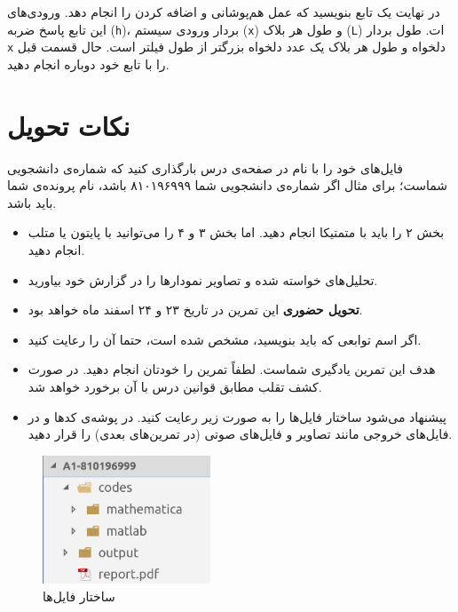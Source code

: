 \documentclass{utsignal}
\begin{document}
	در نهایت یک تابع بنویسید که عمل هم‌پوشانی و اضافه کردن را انجام دهد. ورودی‌های این تابع پاسخ ضربه (\lstinline[language=Octave]{h})، بردار ورودی سیستم (\lstinline[language=Octave]{x}) و طول هر بلاک (\lstinline[language=Octave]{L}) ات. طول بردار \lstinline[language=Octave]{x} دلخواه و طول هر بلاک یک عدد دلخواه بزرگتر از طول فیلتر است. حال قسمت قبل را با تابع خود دوباره انجام دهید.
	
	\section{نکات تحویل}
	فایل‌های خود را با نام  در صفحه‌ی  درس بارگذاری کنید که  شماره‌ی دانشجویی شماست؛ برای مثال اگر شماره‌ی دانشجویی شما ۸۱۰۱۹۶۹۹۹ باشد، نام پرونده‌ی شما باید  باشد.
	\begin{itemize}
		\item بخش ۲ را باید با متمتیکا انجام دهید. اما بخش ۳ و ۴ را می‌توانید با پایتون یا متلب انجام دهید.
		\item تحلیل‌های خواسته شده و تصاویر نمودارها را در گزارش خود بیاورید.
		\item \textbf{تحویل حضوری} این تمرین در تاریخ ۲۳ و ۲۴ اسفند ماه خواهد بود.
		\item اگر اسم توابعی که باید بنویسید، مشخص شده است، حتما آن را رعایت کنید.
		\item هدف این تمرین یادگیری شماست. لطفاً تمرین را خودتان انجام دهید. در صورت کشف تقلب مطابق قوانین درس با آن برخورد خواهد شد.
		\item پیشنهاد می‌شود ساختار فایل‌ها را به صورت زیر رعایت کنید. در پوشه‌ی  کدها و در  فایل‌های خروجی مانند تصاویر و فایل‌های صوتی (در تمرین‌های بعدی) را قرار دهید.
	\end{itemize}
	\begin{figure}[h]
		\centering
		\includegraphics[width=5cm]{structure.png}
		\caption{ساختار فایل‌ها}
	\end{figure}
\end{document}

